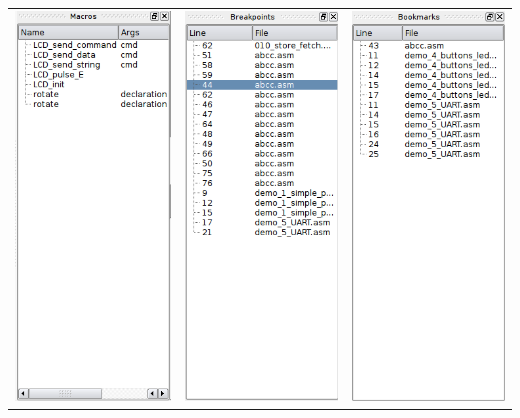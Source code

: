         \begin{table}[h!]
            \begin{tabular}{ccc}
                \includegraphics[width=.3\textwidth]{img/listmacros.png}
                    &
                \includegraphics[width=.3\textwidth]{img/listbreakpoints.png}
                    &
                \includegraphics[width=.3\textwidth]{img/listbookmarks.png}

\end{tabular}
\end{table}
